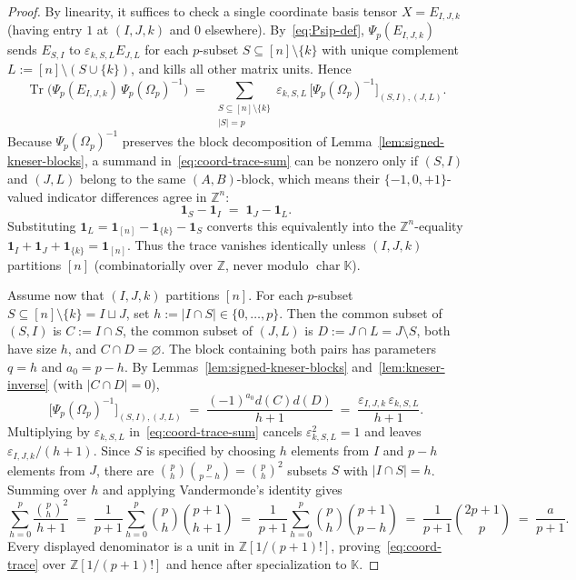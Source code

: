 \documentclass[11pt,reqno]{amsart}
\theoremstyle{definition}
\theoremstyle{remark}
\numberwithin{equation}{section}
\newcommand{\KK}{\mathbb{K}}
\newcommand{\ZZ}{\mathbb{Z}}
\DeclareMathOperator{\Tr}{Tr}
\DeclareMathOperator{\chr}{char}
\begin{document}
\begin{proof}
By linearity, it suffices to check a single coordinate basis tensor $X = E_{I,J,k}$ (having entry $1$ at $(I, J, k)$ and $0$ elsewhere). By~\eqref{eq:Psip-def}, $\Psi_p(E_{I,J,k})$ sends $E_{S,I}$ to $\varepsilon_{k,S,L} E_{J,L}$ for each $p$-subset $S \subseteq [n]\setminus\{k\}$ with unique complement $L := [n]\setminus(S \cup \{k\})$, and kills all other matrix units. Hence
\begin{equation}\label{eq:coord-trace-sum}
  \Tr\bigl(\Psi_p(E_{I,J,k})\,\Psi_p(\Omega_p)^{-1}\bigr) \;=\; \sum_{\substack{S \subseteq [n]\setminus\{k\} \\ |S| = p}} \varepsilon_{k,S,L}\, \bigl[\Psi_p(\Omega_p)^{-1}\bigr]_{(S,I),(J,L)}.
\end{equation}
Because $\Psi_p(\Omega_p)^{-1}$ preserves the block decomposition of Lemma~\ref{lem:signed-kneser-blocks}, a summand in~\eqref{eq:coord-trace-sum} can be nonzero only if $(S, I)$ and $(J, L)$ belong to the same $(A, B)$-block, which means their $\{-1, 0, +1\}$-valued indicator differences agree in $\ZZ^n$:
\[
  \mathbf{1}_S - \mathbf{1}_I \;=\; \mathbf{1}_J - \mathbf{1}_L.
\]
Substituting $\mathbf{1}_L = \mathbf{1}_{[n]} - \mathbf{1}_{\{k\}} - \mathbf{1}_S$ converts this equivalently into the $\ZZ^n$-equality $\mathbf{1}_I + \mathbf{1}_J + \mathbf{1}_{\{k\}} = \mathbf{1}_{[n]}$. Thus the trace vanishes identically unless $(I, J, k)$ partitions $[n]$ (combinatorially over $\ZZ$, never modulo $\chr\KK$).

Assume now that $(I, J, k)$ partitions $[n]$. For each $p$-subset $S \subseteq [n]\setminus\{k\} = I \sqcup J$, set $h := |I \cap S| \in \{0, \dots, p\}$. Then the common subset of $(S, I)$ is $C := I \cap S$, the common subset of $(J, L)$ is $D := J \cap L = J \setminus S$, both have size $h$, and $C \cap D = \varnothing$. The block containing both pairs has parameters $q = h$ and $a_0 = p - h$. By Lemmas~\ref{lem:signed-kneser-blocks} and~\ref{lem:kneser-inverse} (with $|C \cap D| = 0$),
\[
  \bigl[\Psi_p(\Omega_p)^{-1}\bigr]_{(S,I),(J,L)} \;=\; \frac{(-1)^{a_0} d(C) d(D)}{h + 1} \;=\; \frac{\varepsilon_{I,J,k}\,\varepsilon_{k,S,L}}{h + 1}.
\]
Multiplying by $\varepsilon_{k,S,L}$ in~\eqref{eq:coord-trace-sum} cancels $\varepsilon_{k,S,L}^2 = 1$ and leaves $\varepsilon_{I,J,k}/(h + 1)$. Since $S$ is specified by choosing $h$ elements from $I$ and $p - h$ elements from $J$, there are $\binom{p}{h}\binom{p}{p-h} = \binom{p}{h}^2$ subsets $S$ with $|I \cap S| = h$. Summing over $h$ and applying Vandermonde's identity gives
\[
  \sum_{h=0}^p \frac{\binom{p}{h}^2}{h + 1}
  \;=\; \frac{1}{p + 1}\sum_{h=0}^p \binom{p}{h}\binom{p + 1}{h + 1}
  \;=\; \frac{1}{p + 1}\sum_{h=0}^p \binom{p}{h}\binom{p + 1}{p - h}
  \;=\; \frac{1}{p + 1}\binom{2p + 1}{p}
  \;=\; \frac{a}{p + 1}.
\]
Every displayed denominator is a unit in $\ZZ[1/(p+1)!]$, proving~\eqref{eq:coord-trace} over $\ZZ[1/(p+1)!]$ and hence after specialization to $\KK$.
\end{proof}
\end{document}
